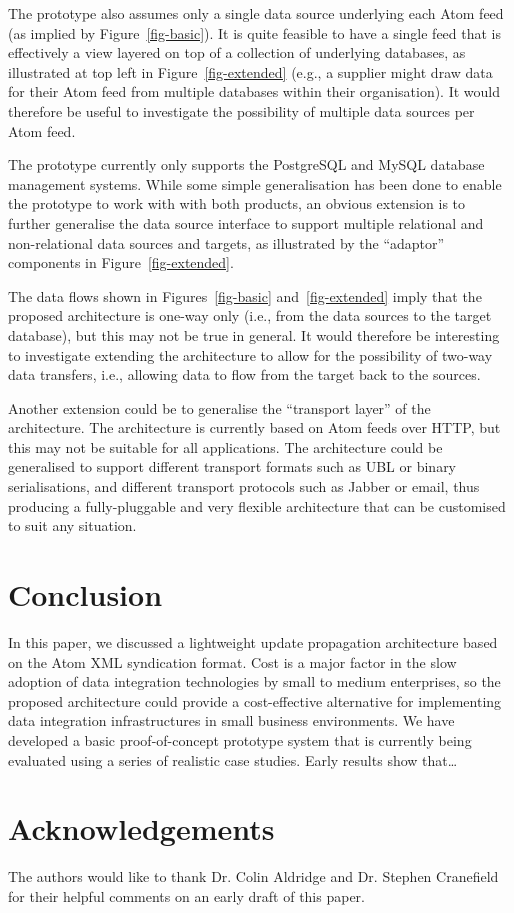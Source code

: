 \documentclass{CRPITStyle}
\begin{document}
The prototype also assumes only a single data source underlying each
Atom feed (as implied by Figure~\ref{fig-basic}). It is quite feasible
to have a single feed that is effectively a view layered on top of a
collection of underlying databases, as illustrated at top left in
Figure~\ref{fig-extended} (e.g., a supplier might draw data for their
Atom feed from multiple databases within their organisation). It would
therefore be useful to investigate the possibility of multiple data
sources per Atom feed.

The prototype currently only supports the PostgreSQL and MySQL database
management systems. While some simple generalisation has been done to
enable the prototype to work with with both products, an obvious
extension is to further generalise the data source interface to support
multiple relational and non-relational data sources and targets, as
illustrated by the ``adaptor'' components in Figure~\ref{fig-extended}.

The data flows shown in Figures~\ref{fig-basic} and~\ref{fig-extended}
imply that the proposed architecture is one-way only (i.e., from the
data sources to the target database), but this may not be true in
general. It would therefore be interesting to investigate extending the
architecture to allow for the possibility of two-way data transfers,
i.e., allowing data to flow from the target back to the sources.

Another extension could be to generalise the ``transport layer'' of the
architecture. The architecture is currently based on Atom feeds over
HTTP, but this may not be suitable for all applications. The
architecture could be generalised to support different transport formats
such as UBL or binary serialisations, and different transport protocols
such as Jabber or email, thus producing a fully-pluggable and very
flexible architecture that can be customised to suit any situation.


\section{Conclusion}
\label{sec-conclusion}

In this paper, we discussed a lightweight update propagation
architecture based on the Atom XML syndication format. Cost is a major
factor in the slow adoption of data integration technologies by small to
medium enterprises, so the proposed architecture could provide a
cost-effective alternative for implementing data integration
infrastructures in small business environments. We have developed a
basic proof-of-concept prototype system that is currently being
evaluated using a series of realistic case studies. Early results show
that\ldots


\section*{Acknowledgements}
\label{sec-acknowledgements}

The authors would like to thank Dr. Colin Aldridge and Dr. Stephen
Cranefield for their helpful comments on an early draft of this paper.




\end{document}
